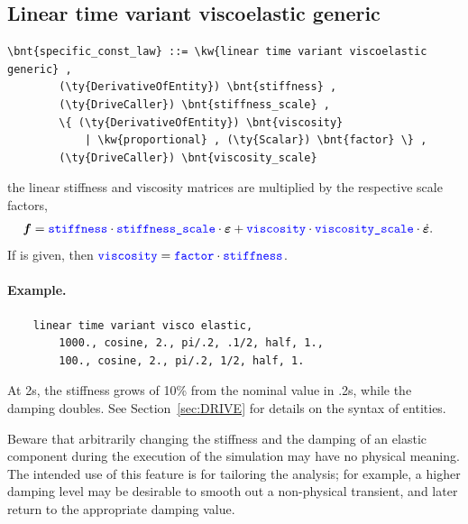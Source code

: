 \subsection{Linear time variant viscoelastic generic}
\begin{Verbatim}[commandchars=\\\{\}]
    \bnt{specific_const_law} ::= \kw{linear time variant viscoelastic generic} ,
        (\ty{DerivativeOfEntity}) \bnt{stiffness} ,
        (\ty{DriveCaller}) \bnt{stiffness_scale} ,
        \{ (\ty{DerivativeOfEntity}) \bnt{viscosity}
            | \kw{proportional} , (\ty{Scalar}) \bnt{factor} \} ,
        (\ty{DriveCaller}) \bnt{viscosity_scale}
\end{Verbatim}
the linear stiffness and viscosity matrices are multiplied
by the respective scale factors,
\begin{align}
	\boldsymbol{f} &= \textcolor{blue}{\texttt{stiffness}} \cdot \textcolor{blue}{\texttt{stiffness\_scale}} \cdot \boldsymbol{\varepsilon}
		+ \textcolor{blue}{\texttt{viscosity}} \cdot \textcolor{blue}{\texttt{viscosity\_scale}} \cdot \dot{\boldsymbol{\varepsilon}}
	.
\end{align}
If  is given, then
$\textcolor{blue}{\texttt{viscosity}} = \textcolor{blue}{\texttt{factor}} \cdot \textcolor{blue}{\texttt{stiffness}}$.

\paragraph{Example.}
\begin{verbatim}
    linear time variant visco elastic,
        1000., cosine, 2., pi/.2, .1/2, half, 1.,
        100., cosine, 2., pi/.2, 1/2, half, 1.
\end{verbatim}
At 2s, the stiffness grows of 10\% from the nominal value in .2s,
while the damping doubles.
See Section~\ref{sec:DRIVE} for details on the syntax
of  entities.

Beware that arbitrarily changing the stiffness
and the damping of an elastic component during the execution
of the simulation may have no physical meaning.
The intended use of this feature is for tailoring the analysis;
for example, a higher damping level may be desirable to smooth out
a non-physical transient, and later return to the appropriate damping value.
  
